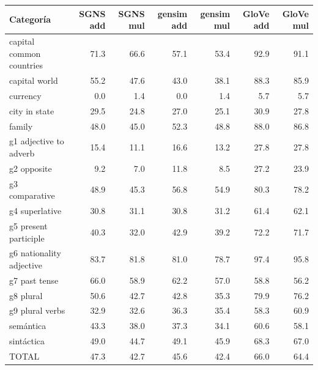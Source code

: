 \begin{tabular}{lrrrrrr}
\toprule
Categoría & SGNS add & SGNS mul & gensim add & gensim mul & GloVe add & GloVe mul \\
\midrule
capital common countries & 71.3 & 66.6 & 57.1 & 53.4 & 92.9 & 91.1 \\
capital world & 55.2 & 47.6 & 43.0 & 38.1 & 88.3 & 85.9 \\
currency & 0.0 & 1.4 & 0.0 & 1.4 & 5.7 & 5.7 \\
city in state & 29.5 & 24.8 & 27.0 & 25.1 & 30.9 & 27.8 \\
family & 48.0 & 45.0 & 52.3 & 48.8 & 88.0 & 86.8 \\
g1 adjective to adverb & 15.4 & 11.1 & 16.6 & 13.2 & 27.8 & 27.8 \\
g2 opposite & 9.2 & 7.0 & 11.8 & 8.5 & 27.2 & 23.9 \\
g3 comparative & 48.9 & 45.3 & 56.8 & 54.9 & 80.3 & 78.2 \\
g4 superlative & 30.8 & 31.1 & 30.8 & 31.2 & 61.4 & 62.1 \\
g5 present participle & 40.3 & 32.0 & 42.9 & 39.2 & 72.2 & 71.7 \\
g6 nationality adjective & 83.7 & 81.8 & 81.0 & 78.7 & 97.4 & 95.8 \\
g7 past tense & 66.0 & 58.9 & 62.2 & 57.0 & 58.8 & 56.2 \\
g8 plural & 50.6 & 42.7 & 42.8 & 35.3 & 79.9 & 76.2 \\
g9 plural verbs & 32.9 & 32.6 & 36.3 & 35.4 & 58.3 & 60.9 \\
semántica & 43.3 & 38.0 & 37.3 & 34.1 & 60.6 & 58.1 \\
sintáctica & 49.0 & 44.7 & 49.1 & 45.9 & 68.3 & 67.0 \\
TOTAL & 47.3 & 42.7 & 45.6 & 42.4 & 66.0 & 64.4 \\
\bottomrule
\end{tabular}